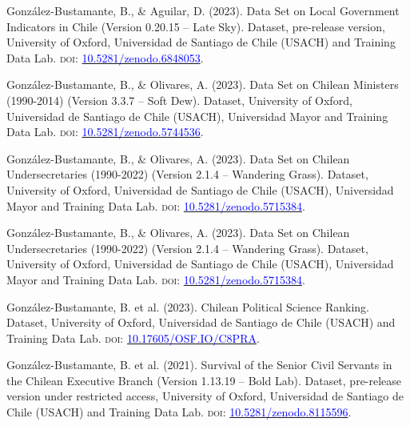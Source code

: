 \begin{publications}

\begin{benumerate}{6}

\item{González-Bustamante, B., \& Aguilar, D. (2023). Data Set on Local Government Indicators in Chile (Version 0.20.15 -- Late Sky). Dataset, pre-release version, University of Oxford, Universidad de Santiago de Chile (USACH) and Training Data Lab. {\scshape doi:} \href{https://doi.org/10.5281/zenodo.6848053}{\textcolor{blue}{10.5281/zenodo.6848053}}.}\vspace{1mm}

\item{González-Bustamante, B., \& Olivares, A. (2023). Data Set on Chilean Ministers (1990-2014) (Version 3.3.7 -- Soft Dew). Dataset, University of Oxford, Universidad de Santiago de Chile (USACH), Universidad Mayor and Training Data Lab. {\scshape doi:} \href{https://doi.org/10.5281/zenodo.5744536}{\textcolor{blue}{10.5281/zenodo.5744536}}.}\vspace{1mm}

\item{González-Bustamante, B., \& Olivares, A. (2023). Data Set on Chilean Undersecretaries (1990-2022) (Version 2.1.4 -- Wandering Grass). Dataset, University of Oxford, Universidad de Santiago de Chile (USACH), Universidad Mayor and Training Data Lab. {\scshape doi:} \href{https://doi.org/10.5281/zenodo.5715384}{\textcolor{blue}{10.5281/zenodo.5715384}}.}\vspace{1mm}

\item{González-Bustamante, B., \& Olivares, A. (2023). Data Set on Chilean Undersecretaries (1990-2022) (Version 2.1.4 -- Wandering Grass). Dataset, University of Oxford, Universidad de Santiago de Chile (USACH), Universidad Mayor and Training Data Lab. {\scshape doi:} \href{https://doi.org/10.5281/zenodo.5715384}{\textcolor{blue}{10.5281/zenodo.5715384}}.}\vspace{1mm}

\item{González-Bustamante, B. et al. (2023). Chilean Political Science Ranking. Dataset, University of Oxford, Universidad de Santiago de Chile (USACH) and Training Data Lab. {\scshape doi:} \href{http://doi.org/10.17605/OSF.IO/C8PRA}{\textcolor{blue}{10.17605/OSF.IO/C8PRA}}.}\vspace{1mm}

\item{González-Bustamante, B. et al. (2021). Survival of the Senior Civil Servants in the Chilean Executive Branch (Version 1.13.19 -- Bold Lab). Dataset, pre-release version under restricted access, University of Oxford, Universidad de Santiago de Chile (USACH) and Training Data Lab. {\scshape doi:} \href{https://doi.org/10.5281/zenodo.8115596}{\textcolor{blue}{10.5281/zenodo.8115596}}.}\vspace{1mm}

\end{benumerate}

\end{publications}

